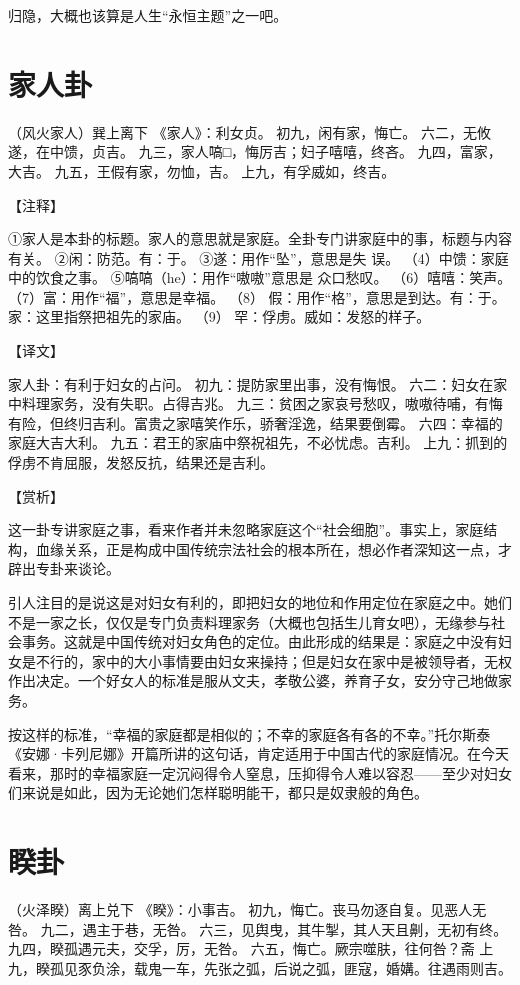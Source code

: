 \documentclass[12pt,UTF8]{ctexbook}
\begin{document}
归隐，大概也该算是人生“永恒主题”之一吧。

\chapter{家人卦}

（风火家人）巽上离下
《家人》：利女贞。
初九，闲有家，悔亡。
六二，无攸遂，在中馈，贞吉。
九三，家人嗃□，悔厉吉；妇子嘻嘻，终吝。
九四，富家，大吉。
九五，王假有家，勿恤，吉。
上九，有孚威如，终吉。

【注释】

①家人是本卦的标题。家人的意思就是家庭。全卦专门讲家庭中的事，标题与内容有关。
②闲：防范。有：于。
③遂：用作“坠”，意思是失 误。
（4）中馈：家庭中的饮食之事。
⑤嗃嗃（he）：用作“嗷嗷”意思是 众口愁叹。
（6）嘻嘻：笑声。
（7）富：用作“福”，意思是幸福。
（8） 假：用作“格”，意思是到达。有：于。家：这里指祭把祖先的家庙。
（9） 罕：俘虏。威如：发怒的样子。

【译文】

家人卦：有利于妇女的占问。
初九：提防家里出事，没有悔恨。
六二：妇女在家中料理家务，没有失职。占得吉兆。
九三：贫困之家哀号愁叹，嗷嗷待哺，有悔有险，但终归吉利。富贵之家嘻笑作乐，骄奢淫逸，结果要倒霉。
六四：幸福的家庭大吉大利。
九五：君王的家庙中祭祝祖先，不必忧虑。吉利。
上九：抓到的俘虏不肯屈服，发怒反抗，结果还是吉利。

【赏析】

这一卦专讲家庭之事，看来作者并未忽略家庭这个“社会细胞”。事实上，家庭结构，血缘关系，正是构成中国传统宗法社会的根本所在，想必作者深知这一点，才辟出专卦来谈论。

引人注目的是说这是对妇女有利的，即把妇女的地位和作用定位在家庭之中。她们不是一家之长，仅仅是专门负责料理家务（大概也包括生儿育女吧），无缘参与社会事务。这就是中国传统对妇女角色的定位。由此形成的结果是：家庭之中没有妇女是不行的，家中的大小事情要由妇女来操持；但是妇女在家中是被领导者，无权作出决定。一个好女人的标准是服从文夫，孝敬公婆，养育子女，安分守己地做家务。

按这样的标准，“幸福的家庭都是相似的；不幸的家庭各有各的不幸。”托尔斯泰《安娜·卡列尼娜》开篇所讲的这句话，肯定适用于中国古代的家庭情况。在今天看来，那时的幸福家庭一定沉闷得令人窒息，压抑得令人难以容忍——至少对妇女们来说是如此，因为无论她们怎样聪明能干，都只是奴隶般的角色。

\chapter{睽卦}

（火泽睽）离上兑下
《睽》：小事吉。
初九，悔亡。丧马勿逐自复。见恶人无咎。
九二，遇主于巷，无咎。
六三，见舆曳，其牛掣，其人天且劓，无初有终。
九四，睽孤遇元夫，交孚，厉，无咎。
六五，悔亡。厥宗噬肤，往何咎？斋
上九，睽孤见豕负涂，载鬼一车，先张之弧，后说之弧，匪寇，婚媾。往遇雨则吉。
\end{document}
